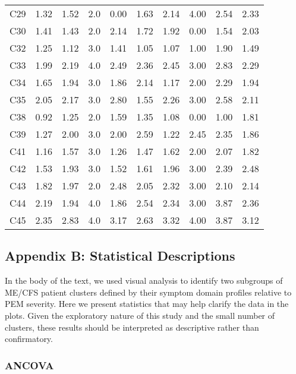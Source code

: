 \documentclass[
  letterpaper,
  DIV=11,
  numbers=noendperiod]{scrartcl}
\begin{document}
\begin{table}[h]
{\begin{tabular*}{\linewidth}{@{\extracolsep{\fill}}lrrrrrrrrr}
C29 & 1.32 & 1.52 & 2.0 & 0.00 & 1.63 & 2.14 & 4.00 & 2.54 & 2.33 \\ 
C30 & 1.41 & 1.43 & 2.0 & 2.14 & 1.72 & 1.92 & 0.00 & 1.54 & 2.03 \\ 
C32 & 1.25 & 1.12 & 3.0 & 1.41 & 1.05 & 1.07 & 1.00 & 1.90 & 1.49 \\ 
C33 & 1.99 & 2.19 & 4.0 & 2.49 & 2.36 & 2.45 & 3.00 & 2.83 & 2.29 \\ 
C34 & 1.65 & 1.94 & 3.0 & 1.86 & 2.14 & 1.17 & 2.00 & 2.29 & 1.94 \\ 
C35 & 2.05 & 2.17 & 3.0 & 2.80 & 1.55 & 2.26 & 3.00 & 2.58 & 2.11 \\ 
C38 & 0.92 & 1.25 & 2.0 & 1.59 & 1.35 & 1.08 & 0.00 & 1.00 & 1.81 \\ 
C39 & 1.27 & 2.00 & 3.0 & 2.00 & 2.59 & 1.22 & 2.45 & 2.35 & 1.86 \\ 
C41 & 1.16 & 1.57 & 3.0 & 1.26 & 1.47 & 1.62 & 2.00 & 2.07 & 1.82 \\ 
C42 & 1.53 & 1.93 & 3.0 & 1.52 & 1.61 & 1.96 & 3.00 & 2.39 & 2.48 \\ 
C43 & 1.82 & 1.97 & 2.0 & 2.48 & 2.05 & 2.32 & 3.00 & 2.10 & 2.14 \\ 
C44 & 2.19 & 1.94 & 4.0 & 1.86 & 2.54 & 2.34 & 3.00 & 3.87 & 2.36 \\ 
C45 & 2.35 & 2.83 & 4.0 & 3.17 & 2.63 & 3.32 & 4.00 & 3.87 & 3.12 \\ 
\bottomrule
\end{tabular*}

}

\end{table}%

\FloatBarrier

\subsection*{Appendix B: Statistical Descriptions}\label{sec-stats}

In the body of the text, we used visual analysis to identify two
subgroups of ME/CFS patient clusters defined by their symptom domain
profiles relative to PEM severity. Here we present statistics that may
help clarify the data in the plots. Given the exploratory nature of this
study and the small number of clusters, these results should be
interpreted as descriptive rather than confirmatory.

\bigskip

\subsubsection*{ANCOVA}\label{sec-ancova}
\end{document}
